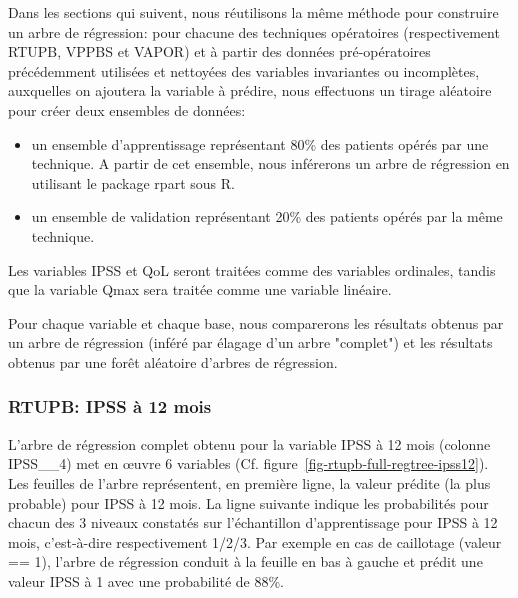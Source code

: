 %
%

%

Dans les sections qui suivent, nous réutilisons la même méthode pour construire un arbre de régression:
pour chacune des techniques opératoires (respectivement RTUPB, VPPBS et VAPOR) et à partir des données pré-opératoires précédemment utilisées et nettoyées des variables invariantes ou incomplètes, auxquelles on ajoutera la variable à prédire, nous effectuons un tirage aléatoire pour créer deux ensembles de données:
\begin{itemize}
\item un ensemble d'apprentissage représentant 80\% des patients opérés par une technique. A partir de cet ensemble, nous inférerons un arbre de régression en utilisant le package rpart sous R.
\item un ensemble de validation représentant 20\% des patients opérés par la même technique.
\end{itemize}
Les variables IPSS et QoL seront traitées comme des variables ordinales, tandis que la variable Qmax sera
traitée comme une variable linéaire.

Pour chaque variable et chaque base, nous comparerons les résultats obtenus par un arbre de régression (inféré par élagage d'un arbre "complet") et les résultats obtenus par une forêt aléatoire d'arbres de régression.

\subsubsection{RTUPB: IPSS à 12 mois}

L'arbre de régression complet obtenu pour la variable IPSS à 12 mois (colonne IPSS\_\_4) met en {\oe}uvre 6 variables (Cf. figure~\ref{fig-rtupb-full-regtree-ipss12}).
Les feuilles de l'arbre représentent, en première ligne, la valeur prédite (la plus probable) pour IPSS à 12 mois. La ligne suivante indique les probabilités pour chacun des 3 niveaux constatés sur l'échantillon d'apprentissage pour IPSS à 12 mois, c'est-à-dire respectivement 1/2/3. Par exemple en cas de caillotage (valeur == 1), l'arbre de régression conduit à la feuille en bas à gauche et prédit une valeur IPSS à 1 avec une probabilité de 88\%.


